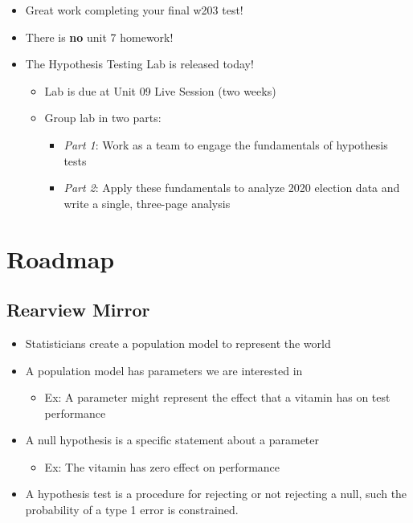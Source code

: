 \documentclass[
]{book}
\providecommand{\tightlist}{%
  \setlength{\itemsep}{0pt}\setlength{\parskip}{0pt}}
\theoremstyle{definition}
\theoremstyle{definition}
\theoremstyle{definition}
\theoremstyle{definition}
\theoremstyle{remark}
\begin{document}
\begin{itemize}
\tightlist
\item
  Great work completing your final w203 test!
\item
  There is \textbf{no} unit 7 homework!
\item
  The Hypothesis Testing Lab is released today!

  \begin{itemize}
  \tightlist
  \item
    Lab is due at Unit 09 Live Session (two weeks)
  \item
    Group lab in two parts:

    \begin{itemize}
    \tightlist
    \item
      \emph{Part 1}: Work as a team to engage the fundamentals of hypothesis tests
    \item
      \emph{Part 2}: Apply these fundamentals to analyze 2020 election data and write a single, three-page analysis
    \end{itemize}
  \end{itemize}
\end{itemize}

\hypertarget{roadmap-3}{%
\section{Roadmap}\label{roadmap-3}}

\hypertarget{rearview-mirror-1}{%
\subsection{Rearview Mirror}\label{rearview-mirror-1}}

\begin{itemize}
\tightlist
\item
  Statisticians create a population model to represent the world
\item
  A population model has parameters we are interested in

  \begin{itemize}
  \tightlist
  \item
    Ex: A parameter might represent the effect that a vitamin has on test performance
  \end{itemize}
\item
  A null hypothesis is a specific statement about a parameter

  \begin{itemize}
  \tightlist
  \item
    Ex: The vitamin has zero effect on performance
  \end{itemize}
\item
  A hypothesis test is a procedure for rejecting or not rejecting a null, such the probability of a type 1 error is constrained.
\end{itemize}
\end{document}
